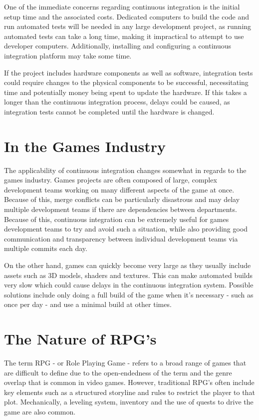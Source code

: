 \documentclass{scrartcl}
\begin{document}
One of the immediate concerns regarding continuous integration is the initial setup time and the associated costs. \cite{amrit2017effectiveness} Dedicated computers to build the code and run automated tests will be needed in any large development project, as running automated tests can take a long time, making it impractical to attempt to use developer computers. Additionally, installing and configuring a continuous integration platform may take some time. 

If the project includes hardware components as well as software, integration tests could require changes to the physical components to be successful, necessitating time and potentially money being spent to update the hardware. If this takes a longer than the continuous integration process, delays could be caused, as integration tests cannot be completed until the hardware is changed. \cite{kasauli2017requirements}


\section{In the Games Industry}

The applicability of continuous integration changes somewhat in regards to the games industry. Games projects are often composed of large, complex development teams working on many different aspects of the game at once. Because of this, merge conflicts can be particularly disastrous and may delay multiple development teams if there are dependencies between departments. Because of this, continuous integration can be extremely useful for games development teams to try and avoid such a situation, while also providing good communication and transparency between individual development teams via multiple commits each day. 

On the other hand, games can quickly become very large as they usually include assets such as 3D models, shaders and textures. This can make automated builds very slow which could cause delays in the continuous integration system. Possible solutions include only doing a full build of the game when it's necessary - such as once per day - and use a minimal build at other times.

\section{The Nature of RPG's}

The term RPG - or Role Playing Game - refers to a broad range of games that are difficult to define due to the open-endedness of the term and the genre overlap that is common in video games. However, traditional RPG's often include key elements such as a structured storyline and rules to restrict the player to that plot. \cite{rpgDef} Mechanically, a leveling system, inventory and the use of quests to drive the game are also common.
\end{document}
